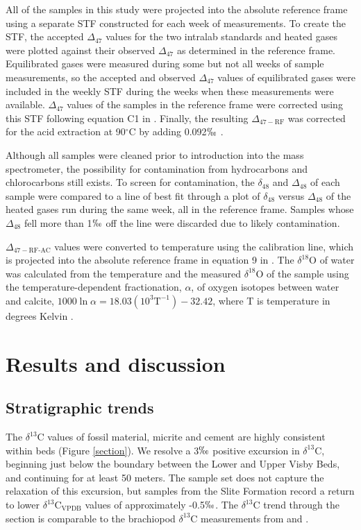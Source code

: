 \documentclass[5p, authoryear]{elsarticle}
\begin{document}
All of the samples in this study were projected into the absolute reference frame using a separate STF constructed for each week of measurements. To create the STF, the accepted $\Delta_{47}$ values for the two intralab standards and heated gases were plotted against their observed $\Delta_{47}$ as determined in the \cite{Ghosh2006} reference frame. Equilibrated gases were measured during some but not all weeks of sample measurements, so the accepted and observed $\Delta_{47}$ values of equilibrated gases were included in the weekly STF during the weeks when these measurements were available. $\Delta_{47}$ values of the samples in the \cite{Ghosh2006} reference frame were corrected using this STF following equation C1 in \cite{Dennis2011}. Finally, the resulting $\Delta_{47-\text{RF}}$ was corrected for the acid extraction at 90$^{\circ}$C by adding 0.092$\permil$ \citep{Henkes2013}.

Although all samples were cleaned prior to introduction into the mass spectrometer, the possibility for contamination from hydrocarbons and chlorocarbons still exists. To screen for contamination, the $\delta_{48}$ and $\Delta_{48}$ of each sample were compared to a line of best fit through a plot of $\delta_{48}$ versus $\Delta_{48}$ of the heated gases run during the same week, all in the \cite{Ghosh2006} reference frame. Samples whose $\Delta_{48}$ fell more than 1$\permil$ off the line were discarded due to likely contamination. 

$\Delta_{47-\text{RF-AC}}$ values were converted to temperature using the \cite{Ghosh2006} calibration line, which is projected into the absolute reference frame in equation 9 in \cite{Dennis2011}. The $\delta^{18}$O of water was calculated from the temperature and the measured $\delta^{18}$O of the sample using the temperature-dependent fractionation, $\alpha$, of oxygen isotopes between water and calcite, $1000\ln\alpha=18.03(10^3\text{T}^{-1})-32.42$, where T is temperature in degrees Kelvin \citep{Kim1997}. 

\section{Results and discussion}

\subsection{Stratigraphic trends}

The $\delta^{13}$C values of fossil material, micrite and cement are highly consistent within beds (Figure \ref{section}). We resolve a 3$\permil$ positive excursion in $\delta^{13}$C, beginning just below the boundary between the Lower and Upper Visby Beds, and continuing for at least 50 meters. The sample set does not capture the relaxation of this excursion, but samples from the Slite Formation record a return to lower $\delta^{13}$C$_{\text{VPDB}}$ values of approximately -0.5$\permil$. The $\delta^{13}$C trend through the section is comparable to the brachiopod $\delta^{13}$C measurements from \cite{Bickert1997} and \cite{Munnecke2003}. 
\end{document}
